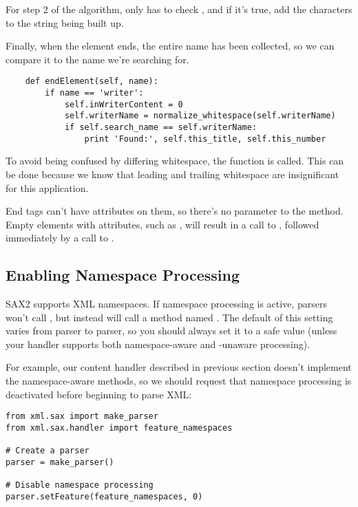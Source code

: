 \documentclass{howto}
\newcommand{\element}[1]{\code{#1}}
\begin{document}
For step 2 of the algorithm,  only has to
check , and if it's true, add the characters to
the string being built up.

Finally, when the \element{writer} element ends, the entire name has
been collected, so we can compare it to the name we're searching for.

\begin{verbatim}
    def endElement(self, name):
        if name == 'writer':
            self.inWriterContent = 0
            self.writerName = normalize_whitespace(self.writerName)
            if self.search_name == self.writerName:
                print 'Found:', self.this_title, self.this_number
\end{verbatim}

To avoid being confused by differing whitespace, the
 function is called.  This can be
done because we know that leading and trailing whitespace are
insignificant for this application.  

End tags can't have attributes on them, so there's no 
parameter to the  method.  Empty elements with
attributes, such as , will result
in a call to , followed immediately by a call
to .

\subsection{Enabling Namespace Processing}

SAX2 supports XML namespaces.  If namespace processing is active,
parsers won't call , but instead will call a
method named . The default of this
setting varies from parser to parser, so you should always set it to a
safe value (unless your handler supports both namespace-aware and
-unaware processing).

For example, our  content handler described in
previous section doesn't implement the namespace-aware methods, so we
should request that namespace processing is deactivated before
beginning to parse XML:

\begin{verbatim}
from xml.sax import make_parser
from xml.sax.handler import feature_namespaces

# Create a parser
parser = make_parser()

# Disable namespace processing
parser.setFeature(feature_namespaces, 0)
\end{verbatim}
\end{document}

